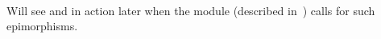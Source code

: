 \begin{code}
\AgdaSymbol{(}\AgdaSpace{}%
\AgdaSpace{}%
\AgdaSymbol{(}\AgdaSpace{}%
\AgdaSymbol{))}\<%
\\
%
\\[\AgdaEmptyExtraSkip]%
%
\>[2]\AgdaSpace{}%
\AgdaSymbol{:}\AgdaSpace{}%
\AgdaSpace{}%
\AgdaSpace{}%
\AgdaSpace{}%
\AgdaSpace{}%
\AgdaSpace{}%
\AgdaSpace{}%
\AgdaSpace{}%
\<%
\\
%
\>[2]\AgdaSpace{}%
\AgdaSymbol{=}\AgdaSpace{}%
\AgdaSpace{}%
\AgdaSpace{}%
\AgdaSymbol{(}\AgdaSpace{}%
\AgdaSymbol{)}\AgdaSpace{}%
\<%
\end{code}
\ccpad
Will see  and  in action later when the
\ualibVarieties module (described in~\cite{DeMeo:2021-3}) calls for such epimorphisms.
